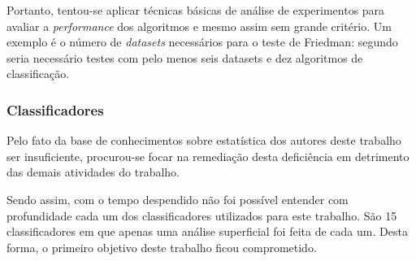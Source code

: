 \documentclass[11pt]{article}
\begin{document}
Portanto, tentou-se aplicar técnicas básicas de análise de experimentos para avaliar a \textit{performance} dos algoritmos e mesmo assim sem grande critério. Um exemplo é o número de \textit{datasets} necessários para o teste de Friedman: segundo \cite{scipy} seria necessário testes com pelo menos seis datasets e dez algoritmos de classificação.

\subsubsection{Classificadores}

Pelo fato da base de conhecimentos sobre estatística dos autores deste trabalho ser insuficiente, procurou-se focar na remediação desta deficiência em detrimento das demais atividades do trabalho.

Sendo assim, com o tempo despendido não foi possível entender com profundidade cada um dos classificadores utilizados para este trabalho. São 15 classificadores em que apenas uma análise superficial foi feita de cada um. Desta forma, o primeiro objetivo deste trabalho ficou comprometido.
\end{document}
